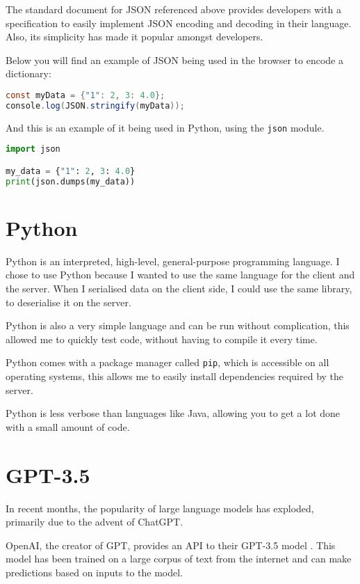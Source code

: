The standard document for JSON referenced above
provides developers with a specification to easily
implement JSON encoding and decoding in their language.
Also, its simplicity has made it popular amongst developers.

Below you will find an example of JSON being used in the browser to encode a dictionary:

\begin{lstlisting}[language=Java]
const myData = {"1": 2, 3: 4.0};
console.log(JSON.stringify(myData));
\end{lstlisting}

And this is an example of it being used in Python, using the \texttt{json} module.

\begin{lstlisting}[language=Python]
import json

my_data = {"1": 2, 3: 4.0}
print(json.dumps(my_data))
\end{lstlisting}

\section{Python}
Python is an interpreted, high-level, general-purpose programming language.
I chose to use Python because I wanted to use the same language for the client and the server.
When I serialised data on the client side, I could use the same
 library, to deserialise it on the server.

Python is also a very simple language and can be run without complication,
this allowed me to quickly test code, without having to compile it every time.

Python comes with a package manager called \texttt{pip},
which is accessible on all operating systems,
this allows me to easily install dependencies required by the server.

Python is less verbose than languages like Java,
allowing you to get a lot done with a small amount of code.

\section{GPT-3.5}
In recent months, the popularity of large language models has exploded,
primarily due to the advent of ChatGPT.

OpenAI, the creator of GPT, provides an
API to their GPT-3.5 model \cite{openai}.
This model has been trained on a large corpus of text from the internet
and can make predictions based on inputs to the model.


